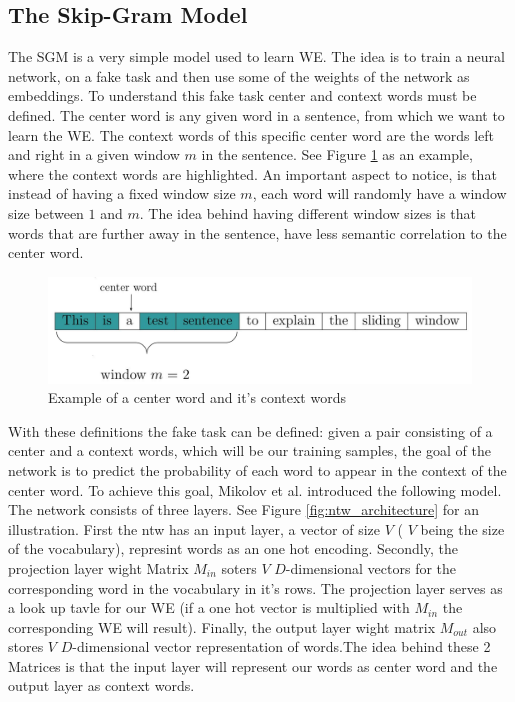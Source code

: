 \subsection{The Skip-Gram Model}
The SGM is a very simple model used to learn WE. The idea is to train a neural network, on a fake task and then use some of the weights of the network as embeddings. To understand this fake task center and context words must be defined. The center word is any given word in a sentence, from which we want to learn the WE. The context words of this specific center word are the words left and right in a given window $m$ in the sentence. See Figure \ref{fig:window_ex} as an example, where the context words are highlighted. An important aspect to notice, is that instead of having a fixed window size $m$, each word will randomly have a window size between $1$ and $m$. The idea behind having different window sizes is that words that are further away in the sentence, have less semantic correlation to the center word.

\begin{figure}[h]
\centering
\includegraphics[scale=0.18]{images/window_ex}
\caption{Example of a center word and it's context words}
\label{fig:window_ex}
\end{figure}
With these definitions the fake task can be defined: given a pair consisting of a center and a context words, which will be our training samples, the goal of the network is to predict the probability of each word to appear in the context of the center word. To achieve this goal, Mikolov et al. introduced the following model. The network consists of three layers. See Figure \ref{fig:ntw_architecture} for an illustration. First the ntw has an input layer, a vector of size $V$ ( $V$ being the size of the vocabulary), represint words as an one hot encoding. Secondly, the projection layer wight Matrix $M_{in}$ soters $V$ $D$-dimensional vectors for the corresponding word in the vocabulary  in it's rows. The projection layer serves as a look up tavle for our WE (if a one hot vector is multiplied with $M_{in}$ the corresponding WE will result). Finally, the output layer wight matrix $M_{out}$ also stores $V$ $D$-dimensional vector representation of words.The idea behind these 2 Matrices is that the input layer will represent our words as center word and the output layer as context words. 

